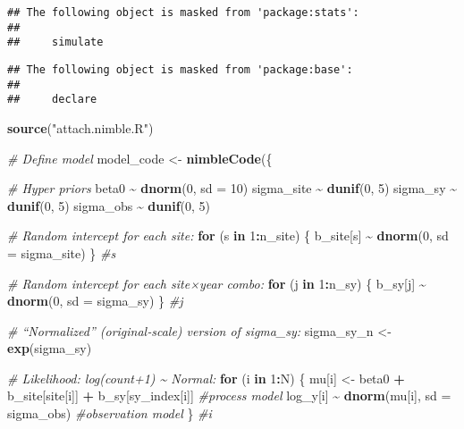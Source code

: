 \documentclass[
]{article}
\newenvironment{Shaded}{\begin{snugshade}}{\end{snugshade}}
\newcommand{\AttributeTok}[1]{\textcolor[rgb]{0.13,0.29,0.53}{#1}}
\newcommand{\CommentTok}[1]{\textcolor[rgb]{0.56,0.35,0.01}{\textit{#1}}}
\newcommand{\ControlFlowTok}[1]{\textcolor[rgb]{0.13,0.29,0.53}{\textbf{#1}}}
\newcommand{\DecValTok}[1]{\textcolor[rgb]{0.00,0.00,0.81}{#1}}
\newcommand{\FunctionTok}[1]{\textcolor[rgb]{0.13,0.29,0.53}{\textbf{#1}}}
\newcommand{\NormalTok}[1]{#1}
\newcommand{\OtherTok}[1]{\textcolor[rgb]{0.56,0.35,0.01}{#1}}
\newcommand{\SpecialCharTok}[1]{\textcolor[rgb]{0.81,0.36,0.00}{\textbf{#1}}}
\newcommand{\StringTok}[1]{\textcolor[rgb]{0.31,0.60,0.02}{#1}}
\begin{document}
\begin{verbatim}
## The following object is masked from 'package:stats':
## 
##     simulate
\end{verbatim}

\begin{verbatim}
## The following object is masked from 'package:base':
## 
##     declare
\end{verbatim}

\begin{Shaded}
\begin{Highlighting}[]
\FunctionTok{source}\NormalTok{(}\StringTok{"attach.nimble.R"}\NormalTok{)}

\CommentTok{\# Define model}
\NormalTok{model\_code }\OtherTok{\textless{}{-}} \FunctionTok{nimbleCode}\NormalTok{(\{}
  
  \CommentTok{\# Hyper priors}
\NormalTok{  beta0      }\SpecialCharTok{\textasciitilde{}} \FunctionTok{dnorm}\NormalTok{(}\DecValTok{0}\NormalTok{, }\AttributeTok{sd =} \DecValTok{10}\NormalTok{)}
\NormalTok{  sigma\_site }\SpecialCharTok{\textasciitilde{}} \FunctionTok{dunif}\NormalTok{(}\DecValTok{0}\NormalTok{, }\DecValTok{5}\NormalTok{)}
\NormalTok{  sigma\_sy   }\SpecialCharTok{\textasciitilde{}} \FunctionTok{dunif}\NormalTok{(}\DecValTok{0}\NormalTok{, }\DecValTok{5}\NormalTok{)}
\NormalTok{  sigma\_obs  }\SpecialCharTok{\textasciitilde{}} \FunctionTok{dunif}\NormalTok{(}\DecValTok{0}\NormalTok{, }\DecValTok{5}\NormalTok{)}
  
  \CommentTok{\# Random intercept for each site:}
  \ControlFlowTok{for}\NormalTok{ (s }\ControlFlowTok{in} \DecValTok{1}\SpecialCharTok{:}\NormalTok{n\_site) \{}
\NormalTok{    b\_site[s] }\SpecialCharTok{\textasciitilde{}} \FunctionTok{dnorm}\NormalTok{(}\DecValTok{0}\NormalTok{, }\AttributeTok{sd =}\NormalTok{ sigma\_site)}
\NormalTok{  \} }\CommentTok{\#s}
  
  \CommentTok{\# Random intercept for each site×year combo:}
  \ControlFlowTok{for}\NormalTok{ (j }\ControlFlowTok{in} \DecValTok{1}\SpecialCharTok{:}\NormalTok{n\_sy) \{}
\NormalTok{    b\_sy[j] }\SpecialCharTok{\textasciitilde{}} \FunctionTok{dnorm}\NormalTok{(}\DecValTok{0}\NormalTok{, }\AttributeTok{sd =}\NormalTok{ sigma\_sy)}
\NormalTok{  \} }\CommentTok{\#j}
  
  \CommentTok{\# “Normalized” (original‐scale) version of sigma\_sy:}
\NormalTok{  sigma\_sy\_n }\OtherTok{\textless{}{-}} \FunctionTok{exp}\NormalTok{(sigma\_sy) }
  
  \CommentTok{\# Likelihood: log(count+1) \textasciitilde{} Normal:}
  \ControlFlowTok{for}\NormalTok{ (i }\ControlFlowTok{in} \DecValTok{1}\SpecialCharTok{:}\NormalTok{N) \{}
\NormalTok{    mu[i]     }\OtherTok{\textless{}{-}}\NormalTok{ beta0 }\SpecialCharTok{+}\NormalTok{ b\_site[site[i]] }\SpecialCharTok{+}\NormalTok{ b\_sy[sy\_index[i]] }\CommentTok{\#process model}
\NormalTok{    log\_y[i] }\SpecialCharTok{\textasciitilde{}} \FunctionTok{dnorm}\NormalTok{(mu[i], }\AttributeTok{sd =}\NormalTok{ sigma\_obs) }\CommentTok{\#observation model}
\NormalTok{  \} }\CommentTok{\#i}
  

\end{Highlighting}
\end{Shaded}
\end{document}
